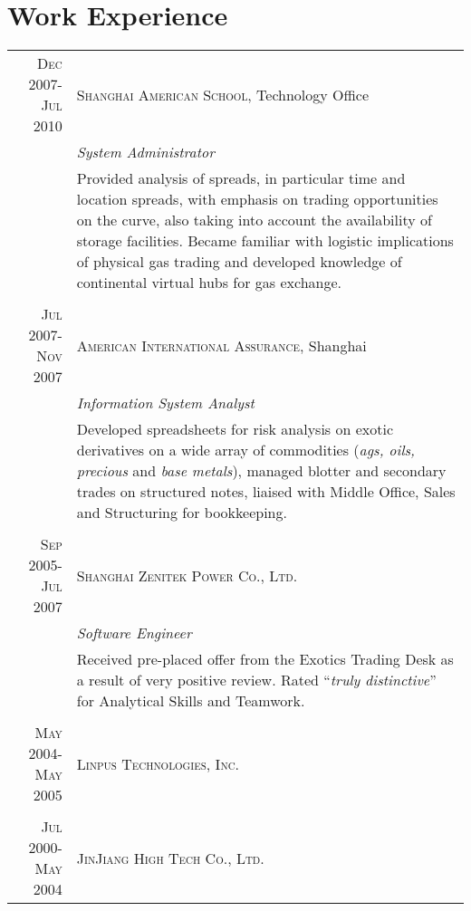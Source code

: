 \documentclass[a4paper,10pt]{article}
\begin{document}
\section{Work Experience}
\begin{tabular}{r|p{11cm}}
 \textsc{Dec 2007-Jul 2010} & \textsc{Shanghai American School}, Technology Office \\&\emph{System Administrator}\\&\footnotesize{Provided analysis of spreads, in particular time and location spreads, with emphasis on trading opportunities on the curve, also taking into account the availability of storage facilities. Became familiar with logistic implications of physical gas trading and developed knowledge of continental virtual hubs for gas exchange.}\\\multicolumn{2}{c}{} \\
 \textsc{Jul 2007-Nov 2007} & \textsc{American International Assurance}, Shanghai \\&\emph{Information System Analyst}\\&\footnotesize{Developed spreadsheets for risk analysis on exotic derivatives on a wide array of commodities (\textit{ags, oils, precious} and \textit{base metals}), managed blotter and secondary trades on structured notes, liaised with Middle Office, Sales and Structuring for bookkeeping.}\\\multicolumn{2}{c}{} \\
\textsc{Sep 2005-Jul 2007} 
& \textsc{Shanghai Zenitek Power Co., Ltd.} \\
&\emph{Software Engineer}\\
&\footnotesize{Received pre-placed offer from the Exotics Trading Desk as a result of very positive review. Rated ``\emph{truly distinctive}'' for Analytical Skills and Teamwork.}\\\multicolumn{2}{c}{} \\

\textsc{May 2004-May 2005} & \textsc{Linpus Technologies, Inc.}
\\\multicolumn{2}{c}{} \\

\textsc{Jul 2000-May 2004} 
&\textsc{JinJiang High Tech Co., Ltd.}

\end{tabular}

\end{document}
